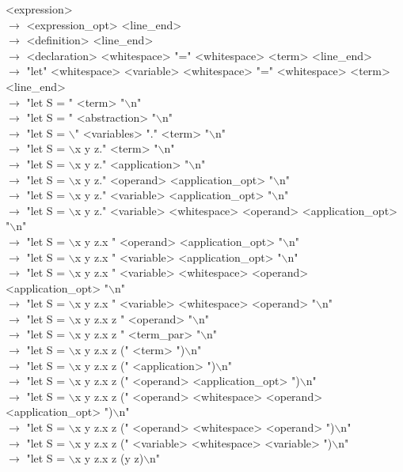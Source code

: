 \documentclass[12pt]{article}
\begin{document}
<expression> \\
$\rightarrow$ <expression\_opt> <line\_end> \\
$\rightarrow$ <definition> <line\_end> \\
$\rightarrow$ <declaration> <whitespace> "=" <whitespace> <term> <line\_end> \\
$\rightarrow$ "let" <whitespace> <variable> <whitespace> "=" <whitespace> <term> <line\_end> \\
$\rightarrow$ "let S = " <term> "$\backslash$n" \\
$\rightarrow$ "let S = " <abstraction> "$\backslash$n" \\
$\rightarrow$ "let S = $\backslash$" <variables> "." <term> "$\backslash$n" \\
$\rightarrow$ "let S = $\backslash$x y z." <term> "$\backslash$n" \\
$\rightarrow$ "let S = $\backslash$x y z." <application> "$\backslash$n" \\
$\rightarrow$ "let S = $\backslash$x y z." <operand> <application\_opt> "$\backslash$n" \\
$\rightarrow$ "let S = $\backslash$x y z." <variable> <application\_opt> "$\backslash$n" \\
$\rightarrow$ "let S = $\backslash$x y z." <variable> <whitespace> <operand> <application\_opt> "$\backslash$n" \\
$\rightarrow$ "let S = $\backslash$x y z.x " <operand> <application\_opt> "$\backslash$n" \\
$\rightarrow$ "let S = $\backslash$x y z.x " <variable> <application\_opt> "$\backslash$n" \\
$\rightarrow$ "let S = $\backslash$x y z.x " <variable> <whitespace> <operand> <application\_opt> "$\backslash$n" \\
$\rightarrow$ "let S = $\backslash$x y z.x " <variable> <whitespace> <operand> "$\backslash$n" \\
$\rightarrow$ "let S = $\backslash$x y z.x z " <operand> "$\backslash$n" \\
$\rightarrow$ "let S = $\backslash$x y z.x z " <term\_par> "$\backslash$n" \\
$\rightarrow$ "let S = $\backslash$x y z.x z (" <term> ")$\backslash$n" \\
$\rightarrow$ "let S = $\backslash$x y z.x z (" <application> ")$\backslash$n" \\
$\rightarrow$ "let S = $\backslash$x y z.x z (" <operand> <application\_opt> ")$\backslash$n" \\
$\rightarrow$ "let S = $\backslash$x y z.x z (" <operand> <whitespace> <operand> <application\_opt> ")$\backslash$n" \\
$\rightarrow$ "let S = $\backslash$x y z.x z (" <operand> <whitespace> <operand> ")$\backslash$n" \\
$\rightarrow$ "let S = $\backslash$x y z.x z (" <variable> <whitespace> <variable> ")$\backslash$n" \\
$\rightarrow$ "let S = $\backslash$x y z.x z (y z)$\backslash$n" \\
\end{document}
